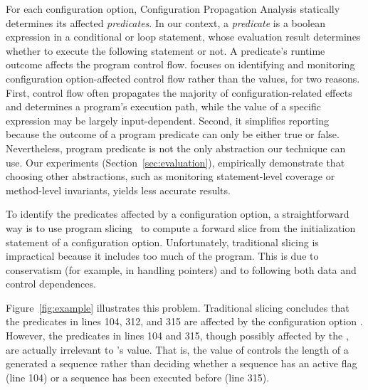 For each configuration option, Configuration Propagation Analysis statically determines
its affected \textit{predicates}. In our context, a \textit{predicate}
is a boolean expression in a conditional or loop statement, whose evaluation result
determines whether to execute the following statement or not.
A predicate's runtime outcome affects the program control flow.
\ourtool focuses on identifying and monitoring 
configuration option-affected control flow
rather than the values, for two reasons. First, control flow 
often propagates the majority of configuration-related effects
and determines a program's execution path, while
the value of a specific expression may be largely input-dependent.
Second, it simplifies reporting because the outcome of a program predicate can only be
either true or false.  Nevertheless, program predicate is not the only
abstraction our technique can use. Our experiments (Section~\ref{sec:evaluation}),
empirically demonstrate that choosing other abstractions,
such as monitoring statement-level coverage
or method-level invariants, yields less accurate results.


To identify the predicates affected by a configuration option, a straightforward
way is to use program slicing~\cite{Horwitz:1988} to compute
a forward slice from the initialization statement of a
configuration option. Unfortunately, traditional slicing is impractical
because it includes too much of the program.  This is due to conservatism
(for example, in handling pointers) and to following both data and control
dependences.


Figure~\ref{fig:example} illustrates
this problem.  Traditional slicing concludes that the predicates
in lines 104, 312, and 315 are affected by the configuration option .
However, the predicates in lines 104 and 315, though possibly
affected by the , are actually irrelevant
to 's value. That is, the value of 
controls the length of a generated a sequence rather
than deciding whether a sequence has an active flag (line 104) or
a sequence has been executed before (line 315).

